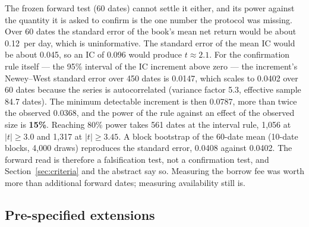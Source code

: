 The frozen forward test (60 dates) cannot settle it either, and its power against the quantity it is asked to confirm is the one number the protocol was missing. Over 60 dates the standard error of the book's mean net return would be about 0.12\pp\ per day, which is uninformative. The standard error of the mean IC would be about 0.045, so an IC of 0.096 would produce $t\approx2.1$. For the confirmation rule itself --- the 95\% interval of the IC increment above zero --- the increment's Newey--West standard error over 450 dates is 0.0147, which scales to 0.0402 over 60 dates because the series is autocorrelated (variance factor 5.3, effective sample 84.7 dates). The minimum detectable increment is then 0.0787, more than twice the observed 0.0368, and the power of the rule against an effect of the observed size is \textbf{15\%}. Reaching 80\% power takes 561 dates at the interval rule, 1,056 at $|t|\ge3.0$ and 1,317 at $|t|\ge3.45$. A block bootstrap of the 60-date mean (10-date blocks, 4,000 draws) reproduces the standard error, 0.0408 against 0.0402. The forward read is therefore a falsification test, not a confirmation test, and Section~\ref{sec:criteria} and the abstract say so. Measuring the borrow fee was worth more than additional forward dates; measuring availability still is.

\subsection{Pre-specified extensions}\label{sec:extensions}

